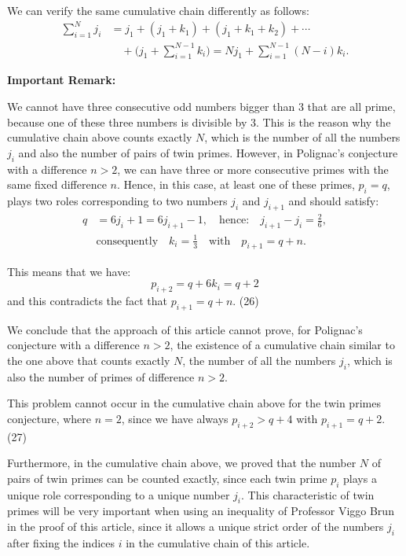 \documentclass[11pt]{article}
\begin{document}
We can verify the same cumulative chain differently as follows:
\begin{equation}
\begin{aligned}\sum_{i=1}^{N} j_i &= j_1 + (j_1+k_1) + (j_1+k_1+k_2) + \cdots \\ &\quad + \Big(j_1+\sum_{i=1}^{N-1}k_i\Big) = N j_1 + \sum_{i=1}^{N-1}(N-i)k_i.\end{aligned}
\end{equation}

\textbf{Important Remark:}

We cannot have three consecutive odd numbers bigger than $3$ that are all prime, because one of these three numbers is divisible by $3$. This is the reason why the cumulative chain above counts exactly $N$, which is the number of all the numbers $j_i$ and also the number of pairs of twin primes. However, in Polignac's conjecture with a difference $n>2$, we can have three or more consecutive primes with the same fixed difference $n$. Hence, in this case, at least one of these primes, $p_i = q$, plays two roles corresponding to two numbers $j_i$ and $j_{i+1}$ and should satisfy:
\begin{equation}
\begin{aligned}q &= 6j_i+1 = 6j_{i+1}-1, \quad\text{hence:}\quad j_{i+1}-j_i = \frac{2}{6},\\ &\text{consequently}\quad k_i = \frac{1}{3} \quad\text{with}\quad p_{i+1} = q+n.\end{aligned}
\end{equation}

This means that we have:
\begin{equation}
p_{i+2} = q + 6k_i = q+2
\end{equation}
and this contradicts the fact that $p_{i+1} = q+n$. \hfill (26)

We conclude that the approach of this article cannot prove, for Polignac's conjecture with a difference $n>2$, the existence of a cumulative chain similar to the one above that counts exactly $N$, the number of all the numbers $j_i$, which is also the number of primes of difference $n>2$.

This problem cannot occur in the cumulative chain above for the twin primes conjecture, where $n=2$, since we have always $p_{i+2} > q+4$ with $p_{i+1} = q+2$. \hfill (27)

Furthermore, in the cumulative chain above, we proved that the number $N$ of pairs of twin primes can be counted exactly, since each twin prime $p_i$ plays a unique role corresponding to a unique number $j_i$. This characteristic of twin primes will be very important when using an inequality of Professor Viggo Brun \cite{ref4,ref5} in the proof of this article, since it allows a unique strict order of the numbers $j_i$ after fixing the indices $i$ in the cumulative chain of this article.
\end{document}
